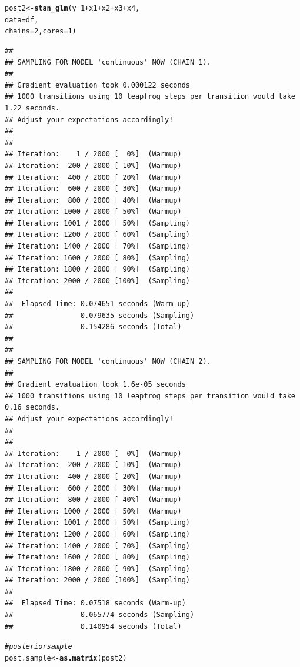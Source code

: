 \documentclass[11pt,a4paper,twoside]{book}\usepackage[]{graphicx}\usepackage[]{color}
\makeatletter
\newcommand{\hlnum}[1]{\textcolor[rgb]{0.686,0.059,0.569}{#1}}%
\newcommand{\hlcom}[1]{\textcolor[rgb]{0.678,0.584,0.686}{\textit{#1}}}%
\newcommand{\hlopt}[1]{\textcolor[rgb]{0,0,0}{#1}}%
\newcommand{\hlstd}[1]{\textcolor[rgb]{0.345,0.345,0.345}{#1}}%
\newcommand{\hlkwb}[1]{\textcolor[rgb]{0.69,0.353,0.396}{#1}}%
\newcommand{\hlkwc}[1]{\textcolor[rgb]{0.333,0.667,0.333}{#1}}%
\newcommand{\hlkwd}[1]{\textcolor[rgb]{0.737,0.353,0.396}{\textbf{#1}}}%
\newenvironment{kframe}{%
 \def\at@end@of@kframe{}%
 \ifinner\ifhmode%
  \def\at@end@of@kframe{\end{minipage}}%
  \begin{minipage}{\columnwidth}%
 \fi\fi%
 \def\FrameCommand##1{\hskip\@totalleftmargin \hskip-\fboxsep
 \colorbox{shadecolor}{##1}\hskip-\fboxsep
     \hskip-\linewidth \hskip-\@totalleftmargin \hskip\columnwidth}%
 \MakeFramed {\advance\hsize-\width
   \@totalleftmargin\z@ \linewidth\hsize
   \@setminipage}}%
 {\par\unskip\endMakeFramed%
 \at@end@of@kframe}
\newenvironment{knitrout}{}{} %
\makeatother
\begin{document}
\begin{knitrout}
\color{fgcolor}\begin{kframe}
\begin{alltt}
\hlstd{post2} \hlkwb{<-} \hlkwd{stan_glm}\hlstd{(y} \hlopt{~} \hlnum{1} \hlopt{+} \hlstd{x1} \hlopt{+} \hlstd{x2} \hlopt{+} \hlstd{x3} \hlopt{+} \hlstd{x4,}
                  \hlkwc{data} \hlstd{= df,}
                  \hlkwc{chains} \hlstd{=} \hlnum{2}\hlstd{,} \hlkwc{cores} \hlstd{=} \hlnum{1}\hlstd{)}
\end{alltt}
\begin{verbatim}
## 
## SAMPLING FOR MODEL 'continuous' NOW (CHAIN 1).
## 
## Gradient evaluation took 0.000122 seconds
## 1000 transitions using 10 leapfrog steps per transition would take 1.22 seconds.
## Adjust your expectations accordingly!
## 
## 
## Iteration:    1 / 2000 [  0%]  (Warmup)
## Iteration:  200 / 2000 [ 10%]  (Warmup)
## Iteration:  400 / 2000 [ 20%]  (Warmup)
## Iteration:  600 / 2000 [ 30%]  (Warmup)
## Iteration:  800 / 2000 [ 40%]  (Warmup)
## Iteration: 1000 / 2000 [ 50%]  (Warmup)
## Iteration: 1001 / 2000 [ 50%]  (Sampling)
## Iteration: 1200 / 2000 [ 60%]  (Sampling)
## Iteration: 1400 / 2000 [ 70%]  (Sampling)
## Iteration: 1600 / 2000 [ 80%]  (Sampling)
## Iteration: 1800 / 2000 [ 90%]  (Sampling)
## Iteration: 2000 / 2000 [100%]  (Sampling)
## 
##  Elapsed Time: 0.074651 seconds (Warm-up)
##                0.079635 seconds (Sampling)
##                0.154286 seconds (Total)
## 
## 
## SAMPLING FOR MODEL 'continuous' NOW (CHAIN 2).
## 
## Gradient evaluation took 1.6e-05 seconds
## 1000 transitions using 10 leapfrog steps per transition would take 0.16 seconds.
## Adjust your expectations accordingly!
## 
## 
## Iteration:    1 / 2000 [  0%]  (Warmup)
## Iteration:  200 / 2000 [ 10%]  (Warmup)
## Iteration:  400 / 2000 [ 20%]  (Warmup)
## Iteration:  600 / 2000 [ 30%]  (Warmup)
## Iteration:  800 / 2000 [ 40%]  (Warmup)
## Iteration: 1000 / 2000 [ 50%]  (Warmup)
## Iteration: 1001 / 2000 [ 50%]  (Sampling)
## Iteration: 1200 / 2000 [ 60%]  (Sampling)
## Iteration: 1400 / 2000 [ 70%]  (Sampling)
## Iteration: 1600 / 2000 [ 80%]  (Sampling)
## Iteration: 1800 / 2000 [ 90%]  (Sampling)
## Iteration: 2000 / 2000 [100%]  (Sampling)
## 
##  Elapsed Time: 0.07518 seconds (Warm-up)
##                0.065774 seconds (Sampling)
##                0.140954 seconds (Total)
\end{verbatim}
\begin{alltt}
\hlcom{#posterior sample}
\hlstd{post.sample} \hlkwb{<-} \hlkwd{as.matrix}\hlstd{(post2)}


\end{alltt}
\end{kframe}
\end{knitrout}
\end{document}
